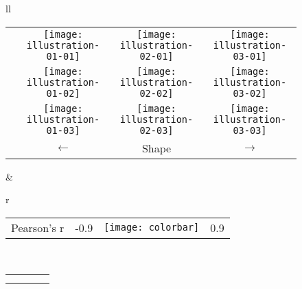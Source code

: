 \documentclass{llncs}
\begin{document}
\begin{figure}[t!]
\scriptsize
\centering
\begin{tabular}{ll}
\begin{tabular}{lccc}
  \raisebox{2.5mm}{\rotatebox[origin=c]{90}{ $ \longrightarrow $ } }&
\texttt{[image: illustration-01-01]} &
\texttt{[image: illustration-02-01]} &
\texttt{[image: illustration-03-01]} \\
  \raisebox{2.5mm}{\rotatebox[origin=c]{90}{ Size } }&
\texttt{[image: illustration-01-02]} &
\texttt{[image: illustration-02-02]} &
\texttt{[image: illustration-03-02]} \\
  \raisebox{2.5mm}{\rotatebox[origin=c]{90}{ $ \longleftarrow $ }} &
\texttt{[image: illustration-01-03]} &
\texttt{[image: illustration-02-03]} &
\texttt{[image: illustration-03-03]} \\
  & $ \longleftarrow $ & Shape & $ \longrightarrow $ \\
\end{tabular}
        &
\begin{tabular}{r}
\begin{tabular}{lrcr}
 Pearson's r  &-0.9 & \texttt{[image: colorbar]} & 0.9
\end{tabular}\\
\begin{tabular}{l|c|c|c}
        \hline 
  \rotatebox[origin=c]{90}{ VBM } &
  \raisebox{-3mm}{\texttt{[image: cor-mass-intensity]}} &
  \raisebox{-3mm}{\texttt{[image: cor-rx-ry-intensity]} }&
  \raisebox{-3mm}{\texttt{[image: cor-rx-ry-mass-intensity]}} \\ \hline
   \raisebox{1mm}{\rotatebox[origin=c]{90}{Cost}}&
  \raisebox{-2mm}{\texttt{[image: cor-mass-cost]} }&
  \raisebox{-2mm}{\texttt{[image: cor-rx-ry-cost]} }&
  \raisebox{-2mm}{\texttt{[image: cor-rx-ry-mass-cost]} } \\
  \raisebox{1mm}{\rotatebox[origin=c]{90}{Mass}}&
  \raisebox{-2mm}{\texttt{[image: cor-mass-mass-border]} }&
  \raisebox{-2mm}{\texttt{[image: cor-rx-ry-mass]} }&

\end{tabular}
\end{tabular}
\end{tabular}
\end{figure}
\end{document}
